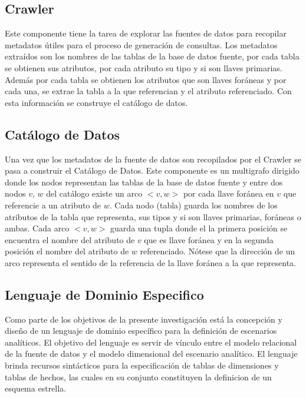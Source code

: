 \subsection{Crawler}

Este componente tiene la tarea de explorar las fuentes de datos para recopilar metadatos \'utiles para el proceso de generaci\'on
de consultas. Los metadatos extra\'idos son los nombres de las tablas de la base de datos fuente, por cada tabla se obtienen sus 
atributos, por cada atributo su tipo y si son llaves primarias. Adem\'as por cada tabla se obtienen los atributos que son llaves 
for\'aneas y por cada una, se extrae la tabla a la que referencian y el atributo referenciado. Con esta información se construye 
el catálogo de datos.

\subsection{Catálogo de Datos}

Una vez que los metadatos de la fuente de datos son recopilados por el Crawler se pasa a construir el Catálogo de Datos. Este componente 
es un multigrafo dirigido donde los nodos representan las tablas de la base de datos fuente y entre dos nodos $v$, $w$ 
del catálogo existe un arco $<v,w>$ por cada llave for\'anea en $v$ que referencie a un atributo de $w$. Cada nodo (tabla) guarda 
los nombres de los atributos de la tabla que representa, sus tipos y si son llaves primarias, for\'aneas o ambas. Cada arco $<v,w>$ 
guarda una tupla donde el la primera posici\'on se encuentra el nombre del atributo de $v$ que es llave for\'anea y en la segunda 
posici\'on el nombre del atributo de $w$ referenciado. N\'otese que la direcci\'on de un arco representa el sentido de la 
referencia de la llave for\'anea a la que representa.

\subsection{Lenguaje de Dominio Especifico}

Como parte de los objetivos de la presente investigaci\'on est\'a la concepción y diseño de un lenguaje de dominio 
espec\'ifico para la definici\'on de escenarios analíticos. El objetivo del lenguaje es servir de v\'inculo 
entre el modelo relacional de la fuente de datos y el modelo dimensional del escenario analítico. El lenguaje 
brinda recursos sintácticos para la especificaci\'on de tablas de dimensiones y tablas de hechos, las cuales 
en su conjunto constituyen la definicion de un esquema estrella.

